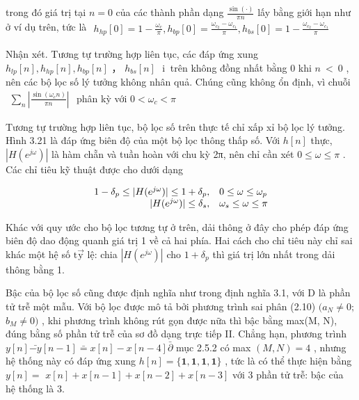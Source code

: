 \documentclass[
  10
]{article}
\begin{document}
trong đó giá trị tại \(n = 0\) của các thành phần dạng
\(\frac { \sin ( \cdot ) } { \pi n }\) lấy bằng giới hạn như ở ví dụ
trên, tức là
\(\begin{array} { r } { h _ { h p } [ 0 ] = 1 - \frac { \omega _ { c } } { \pi } , h _ { b p } [ 0 ] = \frac { \omega _ { c _ { 2 } } - \omega _ { c _ { 1 } } } { \pi } , h _ { b s } [ 0 ] = 1 - \frac { \omega _ { c _ { 2 } } - \omega _ { c _ { 1 } } } { \pi } } \end{array}\)


Nhận xét. Tương tự trường hợp liên tục, các đáp ứng xung
\(h _ { l p } [ n ] , h _ { h p } [ n ] , h _ { b p } [ n ]\) ，
\(h _ { b s } [ n ] \ \mathrm { ~ \ i ~ }\) trên không đồng nhất bằng 0
khi \(n \ < \ 0\) , nên các bộ lọc số lý tưởng không nhân quả. Chúng
cũng không ổn định, vì chuỗi
\(\begin{array} { r } { \sum _ { n } \left| \frac { \sin \left( \omega _ { c } n \right) } { \pi n } \right| } \end{array}\)
phân kỳ với \(0 < \omega _ { c } < \pi\)

Tương tự trường hợp liên tục, bộ lọc số trên thực tế chỉ xấp xỉ bộ lọc
lý tưởng. Hình 3.21 là đáp ứng biên độ của một bộ lọc thông thấp số. Với
\(h [ n ]\) thực, \(| H ( e ^ { j \omega } ) |\) là hàm chẵn và tuần
hoàn với chu kỳ 2π, nên chỉ cần xét \(0 \leq \omega \leq \pi\) . Các chỉ
tiêu kỹ thuật được cho dưới dạng

\[
\begin{array}{r l} {1 - \delta_ {p} \leq | H (e ^ {j \omega}) | \leq 1 + \delta_ {p},} & {0 \leq \omega \leq \omega_ {p}} \\ {| H (e ^ {j \omega}) | \leq \delta_ {s},} & {\omega_ {s} \leq \omega \leq \pi} \end{array}
\]

Khác với quy ước cho bộ lọc tương tự ở trên, dải thông ở đây cho phép
đáp ứng biên độ dao động quanh giá trị 1 về cả hai phía. Hai cách cho
chỉ tiêu này chỉ sai khác một hệ số \(\mathrm { t \vec { y } }\) lệ:
chia \(| H ( e ^ { j \omega } ) |\) cho \(1 + \delta _ { p }\) thì giá
trị lớn nhất trong dải thông bằng 1.

Bậc của bộ lọc số cũng được định nghĩa như trong định nghĩa 3.1, với D
là phần tử trễ một mẫu. Với bộ lọc được mô tả bởi phương trình sai phân
(2.10) \(( a _ { N } \neq 0 ;\) \(b _ { M } \neq 0 )\) , khi phương
trình không rút gọn được nữa thì bậc bằng max(M, N), đúng bằng số phần
tử trễ của sơ đồ dạng trực tiếp II. Chẳng hạn, phương trình
\(y [ n ] { \bar { - y } } [ n - 1 ] { \bar { = } } x [ n ] - x [ n - 4 ] { \bar { \partial } }\)
mục 2.5.2 có max \(( M , N ) = 4\) , nhưng hệ thống này có đáp ứng xung
\(h [ n ] = \{ \boldsymbol { 1 } , \boldsymbol { 1 } , \boldsymbol { 1 } , \boldsymbol { 1 } \}\)
, tức là có thể thực hiện bằng \(y [ n ] =\)
\(x [ n ] + x [ n - 1 ] + x [ n - 2 ] + x [ n - 3 ]\) với 3 phần tử trễ:
bậc của hệ thống là 3.
\end{document}

